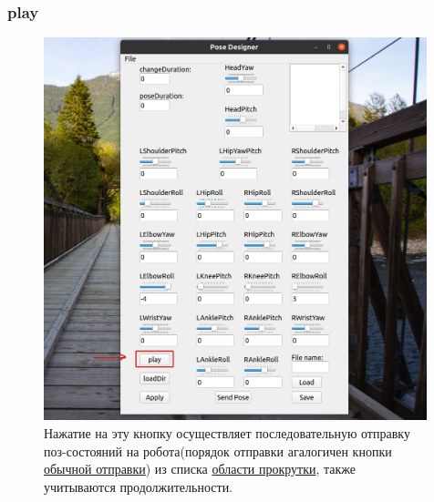 \documentclass[12pt,a4paper]{article}
\begin{document}
\subsubsection{play}
\label{play}
\begin{figure}[h!]
    \centering
    \includegraphics[width=0.99\textwidth]{images/play.png}
    \caption{Нажатие на эту кнопку осуществляет последовательную отправку поз-состояний на робота(порядок отправки агалогичен кнопки \hyperref[sendPose]{обычной отправки}) из списка \hyperref[scroll]{области прокрутки}, также учитываются продолжительности.}
    \label{fig:file}
\end{figure}
\newpage
\end{document}
